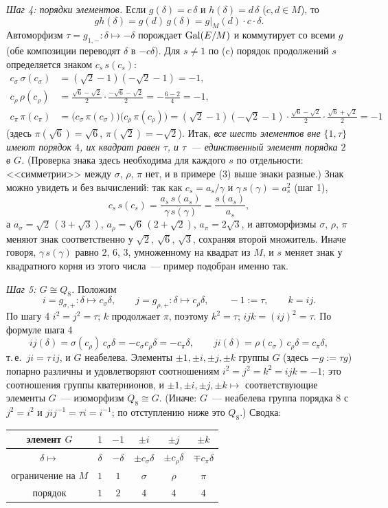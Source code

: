 \emph{Шаг 4: порядки элементов.} Если $g(\delta)=c\,\delta$ и $h(\delta)=d\,\delta$ ($c,d\in M$), то
\[
gh(\delta)=g(d)\,g(\delta)=g|_M(d)\cdot c\cdot\delta .
\]
Автоморфизм $\tau=g_{1,-}\colon\delta\mapsto-\delta$ порождает $\operatorname{Gal}(E/M)$ и коммутирует со всеми $g$ (обе композиции
переводят $\delta$ в $-c\delta$). Для $s\ne1$ по (c) порядок продолжений $s$ определяется знаком $c_s\,s(c_s)$:
\begin{align*}
c_\sigma\,\sigma(c_\sigma)&=(\sqrt2-1)(-\sqrt2-1)=-1,\\
c_\rho\,\rho(c_\rho)&=\tfrac{\sqrt6-\sqrt2}2\cdot\tfrac{-\sqrt6-\sqrt2}2=-\tfrac{6-2}4=-1,\\
c_\pi\,\pi(c_\pi)&=\bigl(c_\sigma\,\pi(c_\sigma)\bigr)\bigl(c_\rho\,\pi(c_\rho)\bigr)
=(\sqrt2-1)(-\sqrt2-1)\cdot\tfrac{\sqrt6-\sqrt2}2\cdot\tfrac{\sqrt6+\sqrt2}2=-1
\end{align*}
(здесь $\pi(\sqrt6)=\sqrt6$, $\pi(\sqrt2)=-\sqrt2$). Итак, \emph{все шесть элементов вне $\{1,\tau\}$ имеют порядок $4$, их
квадрат равен $\tau$, и $\tau$~--- единственный элемент порядка $2$ в $G$.} (Проверка знака здесь необходима для каждого $s$
по отдельности: <<симметрии>> между $\sigma$, $\rho$, $\pi$ нет, и в примере (3) выше знаки разные.)
Знак можно увидеть и без вычислений: так как $c_s=a_s/\gamma$ и $\gamma\,s(\gamma)=a_s^2$ (шаг 1),
\[
c_s\,s(c_s)=\frac{a_s\,s(a_s)}{\gamma\,s(\gamma)}=\frac{s(a_s)}{a_s},
\]
а $a_\sigma=\sqrt2\,(3+\sqrt3)$, $a_\rho=\sqrt6\,(2+\sqrt2)$, $a_\pi=2\sqrt3$, и автоморфизмы $\sigma$, $\rho$, $\pi$ меняют знак
соответственно у $\sqrt2$, $\sqrt6$, $\sqrt3$, сохраняя второй множитель. Иначе говоря, $\gamma\,s(\gamma)$ равно $2$, $6$, $3$,
умноженному на квадрат из $M$, и $s$ меняет знак у квадратного корня из этого числа~--- пример подобран именно так.

\emph{Шаг 5: $G\cong Q_8$.} Положим
\[
i=g_{\sigma,+}\colon\delta\mapsto c_\sigma\delta,\qquad j=g_{\rho,+}\colon\delta\mapsto c_\rho\delta,\qquad -1:=\tau,\qquad k=ij .
\]
По шагу 4 $i^2=j^2=\tau$; $k$ продолжает $\pi$, поэтому $k^2=\tau$; $ijk=(ij)^2=\tau$. По формуле шага 4
\[
ij(\delta)=\sigma(c_\rho)\,c_\sigma\delta=-c_\sigma c_\rho\delta=-c_\pi\delta,\qquad
ji(\delta)=\rho(c_\sigma)\,c_\rho\delta=c_\pi\delta,
\]
т.\,е.\ $ji=\tau\,ij$, и $G$ неабелева. Элементы $\pm1,\pm i,\pm j,\pm k$ группы $G$ (здесь $-g:=\tau g$) попарно различны
и удовлетворяют соотношениям $i^2=j^2=k^2=ijk=-1$; это соотношения группы кватернионов, и
$\pm1,\pm i,\pm j,\pm k\mapsto$ соответствующие элементы $G$~--- изоморфизм $Q_8\cong G$. (Иначе: $G$~--- неабелева группа
порядка $8$ с $j^2=i^2$ и $jij^{-1}=\tau i=i^{-1}$; по отступлению ниже это $Q_8$.) Сводка:
\begin{center}
\begin{tabular}{c|ccccc}
элемент $G$ & $1$ & $-1$ & $\pm i$ & $\pm j$ & $\pm k$\\\hline
$\delta\mapsto$ & $\delta$ & $-\delta$ & $\pm c_\sigma\delta$ & $\pm c_\rho\delta$ & $\mp c_\pi\delta$\\
ограничение на $M$ & $1$ & $1$ & $\sigma$ & $\rho$ & $\pi$\\
порядок & $1$ & $2$ & $4$ & $4$ & $4$
\end{tabular}
\end{center}


